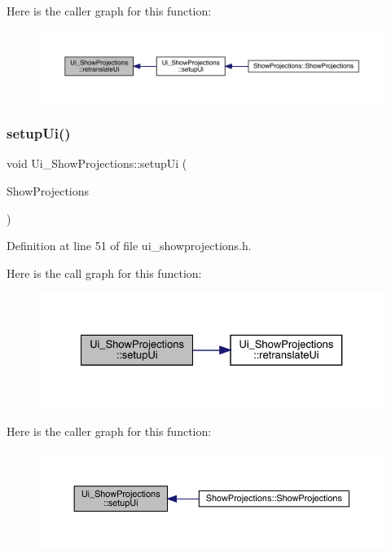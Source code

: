 Here is the caller graph for this function\+:
\nopagebreak
\begin{figure}[H]
\begin{center}
\leavevmode
\includegraphics[width=350pt]{class_ui___show_projections_aa43b9e0a80ae6ac1dd3c4ed5fdae1148_icgraph}
\end{center}
\end{figure}
\mbox{\label{class_ui___show_projections_af020b59d91ff9201c788d0484ac48dda}} 
\subsubsection{\texorpdfstring{setup\+Ui()}{setupUi()}}
{\footnotesize\ttfamily void Ui\+\_\+\+Show\+Projections\+::setup\+Ui (\begin{DoxyParamCaption}\item[{Q\+Main\+Window $\ast$}]{Show\+Projections }\end{DoxyParamCaption})\hspace{0.3cm}{\ttfamily [inline]}}



Definition at line 51 of file ui\+\_\+showprojections.\+h.

Here is the call graph for this function\+:
\nopagebreak
\begin{figure}[H]
\begin{center}
\leavevmode
\includegraphics[width=327pt]{class_ui___show_projections_af020b59d91ff9201c788d0484ac48dda_cgraph}
\end{center}
\end{figure}
Here is the caller graph for this function\+:
\nopagebreak
\begin{figure}[H]
\begin{center}
\leavevmode
\includegraphics[width=350pt]{class_ui___show_projections_af020b59d91ff9201c788d0484ac48dda_icgraph}
\end{center}
\end{figure}


